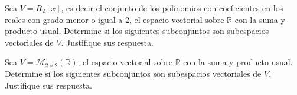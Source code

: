 \documentclass[answers]{exam}
\begin{document}
\begin{questions}
	\question Sea $V=R_2[x]$, es decir el conjunto de los polinomios con coeficientes en los reales con grado menor o igual a 2, el espacio vectorial sobre $\mathbb{R}$ con la suma y producto usual. Determine si los siguientes subconjuntos son subespacios vectoriales de $V$. Justifique sus respuesta.

	\question Sea $V=\mathcal{M}_{2\times 2}(\mathbb{R})$, el espacio vectorial sobre $\mathbb{R}$ con la suma y producto usual. Determine si los siguientes subconjuntos son subespacios vectoriales de $V$. Justifique sus respuesta.
\end{questions}
\end{document}
